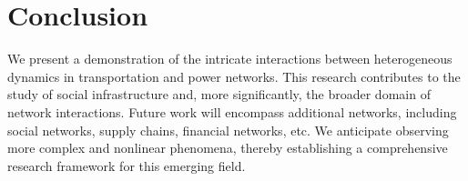 \documentclass[sigconf,anonymous,review]{acmart}
\begin{document}
\section{Conclusion}
We present a demonstration of the intricate interactions between heterogeneous dynamics in transportation and power networks. This research contributes to the study of social infrastructure and, more significantly, the broader domain of network interactions. Future work will encompass additional networks, including social networks, supply chains, financial networks, etc. We anticipate observing more complex and nonlinear phenomena, thereby establishing a comprehensive research framework for this emerging field.










\end{document}
